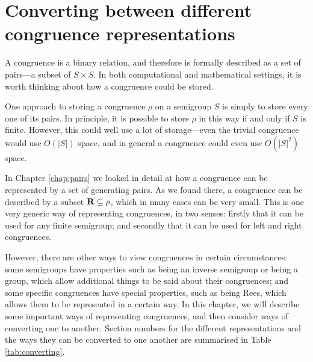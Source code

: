 \chapter{Converting between different congruence representations}
\label{chap:converting}

A congruence is a binary relation, and therefore is formally described as a set
of pairs---a subset of $S \times S$.  In both computational and mathematical
settings, it is worth thinking about how a congruence could be stored.

One approach to storing a congruence $\rho$ on a semigroup $S$ is simply to
store every one of its pairs.  In principle, it is possible to store
$\rho$ in this way if and only if $S$ is finite.  However, this could well use a
lot of storage---even the trivial congruence would use $O(|S|)$ space, and in
general a congruence could even use $O(|S|^2)$ space.

In Chapter \ref{chap:pairs} we looked in detail at how a congruence can be
represented by a set of generating pairs.  As we found there, a congruence can
be described by a subset $\mathbf{R} \subseteq \rho$, which in many cases can be
very small.  This is one very generic way of representing congruences, in two
senses: firstly that it can be used for any finite semigroup; and secondly that
it can be used for left and right congruences.

However, there are other ways to view congruences in certain circumstances: some
semigroups have properties such as being an inverse semigroup or being a group,
which allow additional things to be said about their congruences; and some
specific congruences have special properties, such as being Rees, which allows
them to be represented in a certain way.  In this chapter, we will describe some
important ways of representing congruences, and then consider ways of converting
one to another.  Section numbers for the different representations and the ways
they can be converted to one another are summarised in Table
\ref{tab:converting}.

